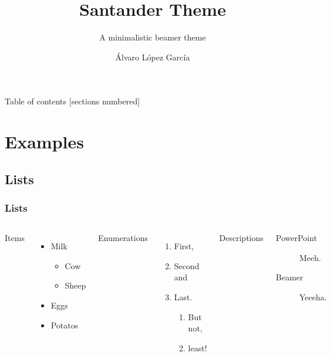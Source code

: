\documentclass[11 pt,t]{beamer}
\author{{\'A}lvaro L{\'o}pez Garc{\'i}a}
\title{Santander Theme}
\subtitle{A minimalistic beamer theme}
\institute{Center for minimalistic beamer themes}
\begin{document}
\maketitle

\begin{frame}{Table of contents}
    [sections numbered]
    \tableofcontents[hideallsubsections]
\end{frame}

\section{Examples}

\subsection{Lists}
\begin{frame}
    \frametitle{Lists}
    \begin{columns}[T,onlytextwidth]
        Items
        \begin{itemize}
            \item Milk
                \begin{itemize}
                    \item Cow
                    \item Sheep
                \end{itemize}
            \item Eggs
            \item Potatos
        \end{itemize}

        Enumerations
        \begin{enumerate}
            \item First,
            \item Second and
            \item Last.
                \begin{enumerate}
                    \item But not,
                    \item least!
                \end{enumerate}
        \end{enumerate}

        Descriptions
        \begin{description}
            \item[PowerPoint] Meeh.
            \item[Beamer] Yeeeha.
        \end{description}
    \end{columns}
\end{frame}
\end{document}
